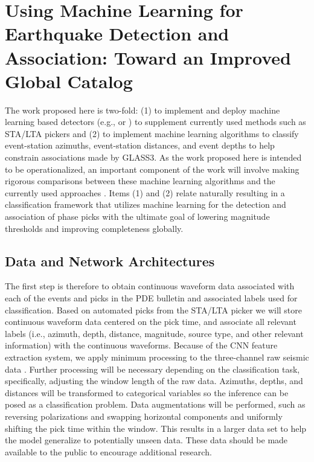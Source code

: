 \documentclass[12p]{article}
\begin{document}
\section{Using Machine Learning for Earthquake Detection and Association: Toward an Improved Global Catalog}
\label{sec:det_ass}

The work proposed here is two-fold: (1) to implement and deploy machine learning based detectors (e.g.,
\citet{Perol2018} or \citet{Ross2018a}) to supplement currently used methods such as STA/LTA pickers and (2) to
implement machine learning algorithms to classify event-station azimuths, event-station distances, and event depths to
help constrain associations made by GLASS3. As the work proposed here is intended to be operationalized, an important
component of the work will involve making rigorous comparisons between these machine learning algorithms and the
currently used approaches \citep{Patton2016, Yeck2019}. Items (1) and (2) relate naturally resulting in a classification
framework that utilizes machine learning for the detection and association of phase picks with the ultimate goal of
lowering magnitude thresholds and improving completeness globally.

\subsection{Data and Network Architectures} \label{sec:arch_data}

The first step is therefore to obtain continuous waveform data associated with each of the events and picks in the PDE
bulletin and associated labels used for classification. Based on automated picks from the STA/LTA picker we will store
continuous waveform data centered on the pick time, and associate all relevant labels (i.e., azimuth, depth, distance,
magnitude, source type, and other relevant information) with the continuous waveforms. Because of the CNN feature
extraction system, we apply minimum processing to the three-channel raw seismic data \citep{Ross2018b}. Further
processing will be necessary depending on the classification task, specifically, adjusting the window length of the raw
data. Azimuths, depths, and distances will be transformed to categorical variables so the inference can be posed as a
classification problem. Data augmentations will be performed, such as reversing polarizations and swapping horizontal
components and uniformly shifting the pick time within the window. This results in a larger data set to help the model
generalize to potentially unseen data. These data should be made available to the public to encourage additional
research.
\end{document}
